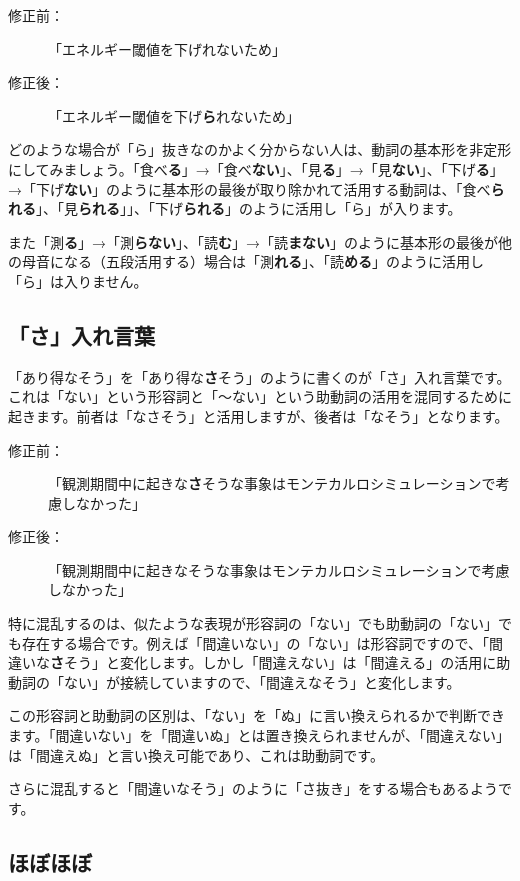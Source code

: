 \begin{description}
\item[修正前：]「エネルギー閾値を下げれないため」
\item[修正後：]「エネルギー閾値を下げ{\bf ら}れないため」
\end{description}

どのような場合が「ら」抜きなのかよく分からない人は、動詞の基本形を非定形にしてみましょう。「食べ{\bf る}」→「食べ{\bf ない}」、「見{\bf る}」→「見{\bf ない}」、「下げ{\bf る}」→「下げ{\bf ない}」のように基本形の最後が取り除かれて活用する動詞は、「食べ{\bf られる}」、「見{\bf られる}」」、「下げ{\bf られる}」のように活用し「ら」が入ります。

また「測{\bf る}」→「測{\bf らない}」、「読{\bf む}」→「読{\bf まない}」のように基本形の最後が他の母音になる（五段活用する）場合は「測{\bf れる}」、「読{\bf める}」のように活用し「ら」は入りません。

\subsection{「さ」入れ言葉}

「あり得なそう」を「あり得な{\bf さ}そう」のように書くのが「さ」入れ言葉です。これは「ない」という形容詞と「〜ない」という助動詞の活用を混同するために起きます。前者は「なさそう」と活用しますが、後者は「なそう」となります。

\begin{description}
\item[修正前：]「観測期間中に起きな{\bf さ}そうな事象はモンテカルロシミュレーションで考慮しなかった」
\item[修正後：]「観測期間中に起きなそうな事象はモンテカルロシミュレーションで考慮しなかった」
\end{description}

特に混乱するのは、似たような表現が形容詞の「ない」でも助動詞の「ない」でも存在する場合です。例えば「間違いない」の「ない」は形容詞ですので、「間違いな{\bf さ}そう」と変化します。しかし「間違えない」は「間違える」の活用に助動詞の「ない」が接続していますので、「間違えなそう」と変化します。

この形容詞と助動詞の区別は、「ない」を「ぬ」に言い換えられるかで判断できます。「間違いない」を「間違いぬ」とは置き換えられませんが、「間違えない」は「間違えぬ」と言い換え可能であり、これは助動詞です。

さらに混乱すると「間違いなそう」のように「さ抜き」をする場合もあるようです。

\subsection{ほぼほぼ}

